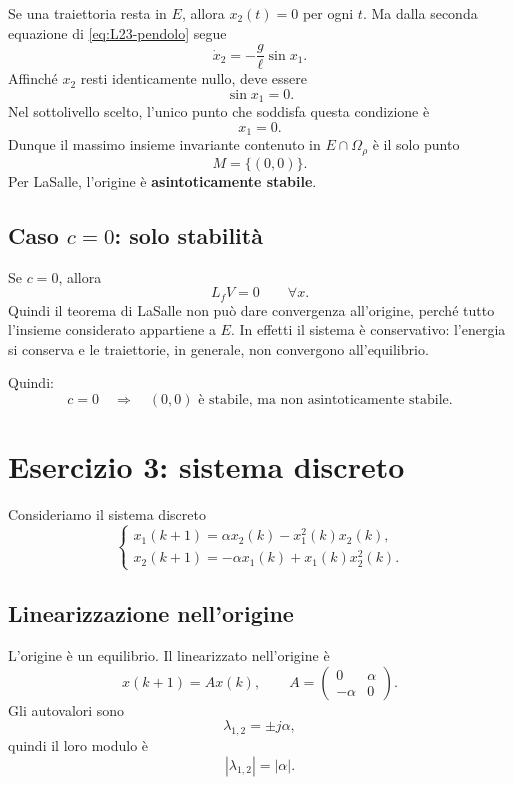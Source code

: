 Se una traiettoria resta in \(E\), allora \(x_2(t)=0\) per ogni \(t\). Ma dalla seconda equazione di \eqref{eq:L23-pendolo} segue
\[
\dot x_2 = -\frac{g}{\ell}\sin x_1.
\]
Affinché \(x_2\) resti identicamente nullo, deve essere
\[
\sin x_1 = 0.
\]
Nel sottolivello scelto, l'unico punto che soddisfa questa condizione è
\[
x_1=0.
\]
Dunque il massimo insieme invariante contenuto in \(E\cap \Omega_\rho\) è il solo punto
\[
M=\{(0,0)\}.
\]
Per LaSalle, l'origine è \textbf{asintoticamente stabile}.

\subsection{Caso \(c=0\): solo stabilità}

Se \(c=0\), allora
\[
L_fV=0
\qquad \forall x.
\]
Quindi il teorema di LaSalle non può dare convergenza all'origine, perché tutto l'insieme considerato appartiene a \(E\). In effetti il sistema è conservativo: l'energia si conserva e le traiettorie, in generale, non convergono all'equilibrio.

Quindi:
\[
c=0
\quad \Longrightarrow \quad
(0,0) \text{ è stabile, ma non asintoticamente stabile.}
\]

\section{Esercizio 3: sistema discreto}
\label{sec:L23-TD}

Consideriamo il sistema discreto
\begin{equation}
\label{eq:L23-TD}
\begin{cases}
x_1(k+1)=\alpha x_2(k)-x_1^2(k)x_2(k),\\[4pt]
x_2(k+1)=-\alpha x_1(k)+x_1(k)x_2^2(k).
\end{cases}
\end{equation}

\subsection{Linearizzazione nell'origine}

L'origine è un equilibrio.  
Il linearizzato nell'origine è
\[
x(k+1)=Ax(k),
\qquad
A=
\begin{pmatrix}
0 & \alpha\\
-\alpha & 0
\end{pmatrix}.
\]
Gli autovalori sono
\[
\lambda_{1,2}=\pm j\alpha,
\]
quindi il loro modulo è
\[
|\lambda_{1,2}|=|\alpha|.
\]

